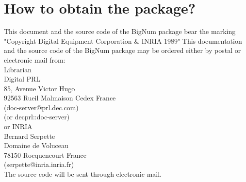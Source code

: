 \clearpage
\section{How to obtain the package?}
\label{HowToObtain}
This document and the source code of the BigNum package bear the
marking "Copyright Digital Equipment Corporation \& INRIA 1989"
This documentation and the source code of the BigNum package may
be ordered either by postal or electronic mail from:\\

    Librarian \\
    Digital PRL\\			
    85, Avenue Victor Hugo\\ 
    92563 Rueil Malmaison Cedex  France\\         
    (doc-server@prl.dec.com) \\
    (or decprl::doc-server) \\

 or INRIA\\			
    Bernard Serpette\\
    Domaine de Voluceau\\ 
    78150 Rocquencourt  France\\
    (serpette@inria.inria.fr)\\

  The source code will be sent through electronic mail.

